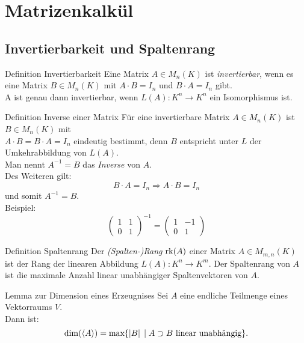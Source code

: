 \documentclass[main.tex]{subfiles}
\begin{document}
\section*{Matrizenkalkül}
\subsection*{Invertierbarkeit und Spaltenrang}

\begin{karte}{Definition Invertierbarkeit}
    Eine Matrix \(A \in M_n(K)\) ist \textit{invertierbar},
    wenn es eine Matrix \(B \in M_n(K)\) mit \(A \cdot B = I_n\) 
    und \(B \cdot A = I_n\) gibt.\\
    A ist genau dann invertierbar, wenn \(L(A): K^n \rightarrow K^n \)
    ein Isomorphismus ist.
\end{karte}
\begin{karte}{Definition Inverse einer Matrix}
    Für eine invertierbare Matrix \(A \in M_n(K)\) ist \(B \in M_n(K)\) 
    mit \\
     \(A \cdot B = B \cdot A = I_n\)
    eindeutig bestimmt, denn \(B\) entspricht unter \(L\) 
    der Umkehrabbildung von \(L(A)\). \\
    Man nennt \(A^{-1} = B\) das \textit{Inverse} von \(A\).\\
    Des Weiteren gilt: 
    \[B \cdot A = I_n \Rightarrow A \cdot B = I_n\] 
    und somit \(A^{-1} = B\).\\
    Beispiel: 
    \[ \begin{pmatrix}
        1 & 1 \\
        0 & 1
    \end{pmatrix}^{-1} = 
    \begin{pmatrix}
        1 & -1 \\
        0 & 1
    \end{pmatrix} \]
\end{karte}
\begin{karte}{Definition Spaltenrang}
    Der \textit{(Spalten-)Rang} \(\operatorname{rk}(A)\) einer Matrix
    \(A \in M_{m,n}(K)\) ist der Rang der linearen Abbildung 
    \(L(A): K^n \rightarrow K^m\).
    Der Spaltenrang von \(A\) ist die maximale Anzahl linear unabhängiger 
    Spaltenvektoren von \(A\).
\end{karte}
\begin{karte}{Lemma zur Dimension eines Erzeugnises}
    Sei \(A\) eine endliche Teilmenge eines Vektorraums \(V\). \\
    Dann ist: 
    \[\dim(\langle A \rangle) = \text{max}\{\left| B \right| \;\vert \; 
    A \supset B \text{ linear unabhängig}\}.\]
\end{karte}
\end{document}
